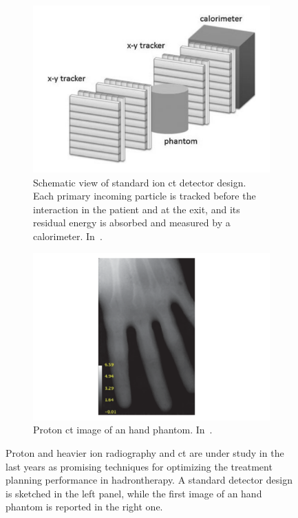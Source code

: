 \begin{figure}[!htbp]
 \begin{subfigure}[t]{.49\textwidth}
\centering
\includegraphics[width=0.9\linewidth]{03_GraphicFiles/chapter1_Introduction/pCT_general.pdf}
\caption{Schematic view of standard ion \gls{ct} detector design. Each primary incoming particle is tracked before the interaction in the patient and at the exit, and its residual energy is absorbed and measured by a calorimeter. In~\cite{Mattiazzo2015}.}
\label{chap1::fig::pCT_design}
\end{subfigure}
\begin{subfigure}[t]{.49\textwidth}
\centering
\includegraphics[width=0.92\linewidth]{03_GraphicFiles/chapter1_Introduction/pCT_image.pdf}
\caption{Proton \gls{ct} image of an hand phantom. In~\cite{Plautz2014}.}
\label{chap1::fig::pCT_image}
\end{subfigure}
\caption{Proton and heavier ion radiography and \gls{ct} are under study in the last years as promising techniques for optimizing the treatment planning performance in hadrontherapy. A standard detector design is sketched in the left panel, while the first image of an hand phantom is reported in the right one.}
\label{chap1::fig::ionCT}
\end{figure} 

